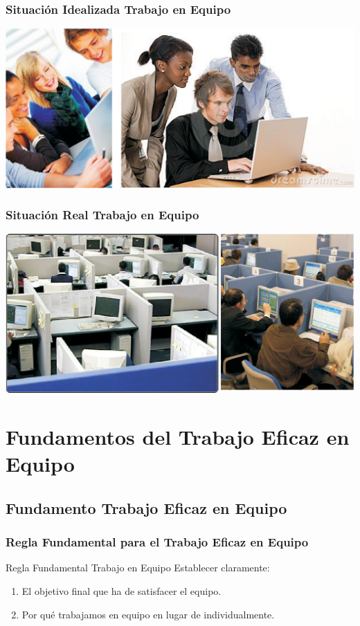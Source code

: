 \documentclass[handout,a4paper,slidestop,xcolor=pst,dvips,blue]{beamer}
\begin{document}
\begin{frame}[c]
	\frametitle{Situación Idealizada Trabajo en Equipo}
	\begin{center}
		\includegraphics[width=\linewidth,keepaspectratio=true]{images/motivacion.eps}
	\end{center}
\end{frame}

\begin{frame}[c]
	\frametitle{Situación Real Trabajo en Equipo}
	\begin{center}
		\includegraphics[width=\linewidth,keepaspectratio=true]{images/realidad.eps}
	\end{center}
\end{frame}

\section{Fundamentos del Trabajo Eficaz en Equipo}

\subsection{Fundamento Trabajo Eficaz en Equipo}

\begin{frame}[c]
	\frametitle{Regla Fundamental para el Trabajo Eficaz en Equipo}
	\begin{block}{Regla Fundamental Trabajo en Equipo}
		Establecer claramente:
		\begin{enumerate}
			\item<2-> El objetivo final que ha de satisfacer el equipo.
			\item<3-> Por qué trabajamos en equipo en lugar de individualmente.
		\end{enumerate}
	\end{block}
\end{frame}
\end{document}
